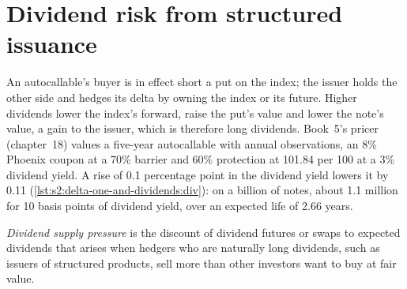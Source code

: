 \begin{omfigure}

\label{fig:s2:delta-one-and-dividends:spread}
\end{omfigure}

\section{Dividend risk from structured issuance}

An autocallable's buyer is in effect short a put on the index; the issuer holds the other side and hedges its delta by owning the index or its
future. Higher dividends lower the index's forward, raise the put's value and lower the note's value, a gain to the issuer, which is therefore long
dividends. Book~5's pricer (chapter~18) values a five-year autocallable with annual observations, an 8\% Phoenix coupon at a 70\% barrier and 60\%
protection at 101.84 per 100 at a 3\% dividend yield. A rise of 0.1 percentage point in the dividend yield lowers it by 0.11
(\cref{lst:s2:delta-one-and-dividends:div}): on a billion of notes, about 1.1 million for 10 basis points of dividend yield, over an expected life of
2.66 years.

\begin{definition}\label{def:s2:delta-one-and-dividends:supply}
\emph{Dividend supply pressure} is the discount of dividend futures or swaps to expected dividends that arises when
hedgers who are naturally long dividends, such as issuers of structured products, sell more than other investors want to buy at fair value.
\end{definition}

